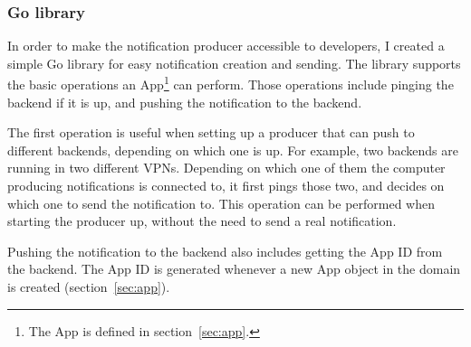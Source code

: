 \subsubsection{Go library}\label{sec:producer-go-library}

In order to make the notification producer
accessible to developers,
I created a simple Go library
for easy notification creation and sending.
The library supports the basic operations
an App\footnote{
  The App is defined in section~\ref{sec:app}.
} can perform.
Those operations include pinging the backend if it is up,
and pushing the notification to the backend.

The first operation is useful when setting up
a producer that can push to different backends,
depending on which one is up.
For example,
two backends are running
in two different VPNs.
Depending on which one of them
the computer producing notifications
is connected to,
it first pings those two,
and decides on which one to send the notification to.
This operation can be performed
when starting the producer up,
without the need to send a real notification.

Pushing the notification to the backend
also includes getting the App \ac{ID} from the backend.
The App \ac{ID} is generated whenever
a new App object in the domain is created
(section~\ref{sec:app}).

